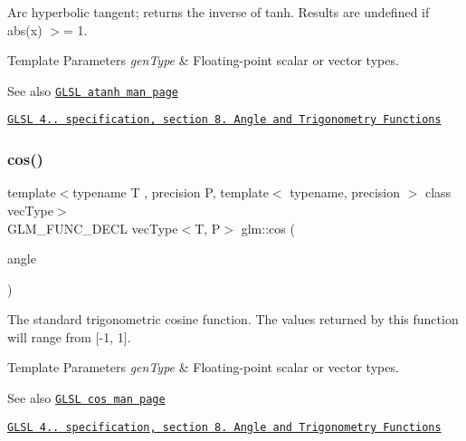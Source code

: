Arc hyperbolic tangent; returns the inverse of tanh. Results are undefined if abs(x) $>$= 1.


\begin{DoxyTemplParams}{Template Parameters}
{\em gen\+Type} & Floating-\/point scalar or vector types.\\
\hline
\end{DoxyTemplParams}
\begin{DoxySeeAlso}{See also}
\href{http://www.opengl.org/sdk/docs/manglsl/xhtml/atanh.xml}{\tt G\+L\+SL atanh man page} 

\href{http://www.opengl.org/registry/doc/GLSLangSpec.4.20.8.pdf}{\tt G\+L\+SL 4.. specification, section 8. Angle and Trigonometry Functions} 
\end{DoxySeeAlso}
\mbox{\label{group__core__func__trigonometric_ga728fd86f14609e37d83f82429995b7b3}} 
\subsubsection{\texorpdfstring{cos()}{cos()}}
{\footnotesize\ttfamily template$<$typename T , precision P, template$<$ typename, precision $>$ class vec\+Type$>$ \\
G\+L\+M\+\_\+\+F\+U\+N\+C\+\_\+\+D\+E\+CL vec\+Type$<$T, P$>$ glm\+::cos (\begin{DoxyParamCaption}\item[{vec\+Type$<$ T, P $>$ const \&}]{angle }\end{DoxyParamCaption})}

The standard trigonometric cosine function. The values returned by this function will range from \mbox{[}-\/1, 1\mbox{]}.


\begin{DoxyTemplParams}{Template Parameters}
{\em gen\+Type} & Floating-\/point scalar or vector types.\\
\hline
\end{DoxyTemplParams}
\begin{DoxySeeAlso}{See also}
\href{http://www.opengl.org/sdk/docs/manglsl/xhtml/cos.xml}{\tt G\+L\+SL cos man page} 

\href{http://www.opengl.org/registry/doc/GLSLangSpec.4.20.8.pdf}{\tt G\+L\+SL 4.. specification, section 8. Angle and Trigonometry Functions} 
\end{DoxySeeAlso}
\mbox{\label{group__core__func__trigonometric_ga660582a4e5e843b6c1cd535777e8c295}} 
